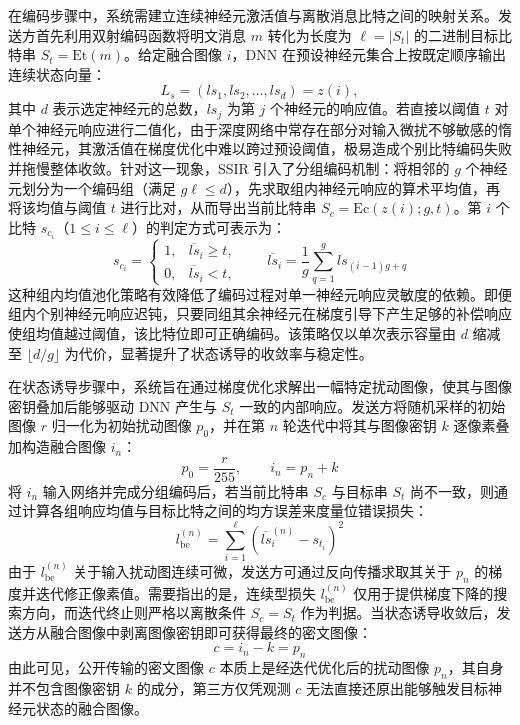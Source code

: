 在编码步骤中，系统需建立连续神经元激活值与离散消息比特之间的映射关系。发送方首先利用双射编码函数将明文消息 \(m\) 转化为长度为 \(\ell = \vert{}S_t\vert{}\) 的二进制目标比特串 \(S_t = \mathrm{Et}(m)\)。给定融合图像 \(i\)，DNN 在预设神经元集合上按既定顺序输出连续状态向量：
\begin{equation}
    L_s = (ls_1, ls_2, \ldots, ls_d) = z(i),
    \label{eq:state}
\end{equation}
其中 \(d\) 表示选定神经元的总数，\(ls_j\) 为第 \(j\) 个神经元的响应值。若直接以阈值 \(t\) 对单个神经元响应进行二值化，由于深度网络中常存在部分对输入微扰不够敏感的惰性神经元，其激活值在梯度优化中难以跨过预设阈值，极易造成个别比特编码失败并拖慢整体收敛。针对这一现象，SSIR 引入了分组编码机制：将相邻的 \(g\) 个神经元划分为一个编码组（满足 \(g \ell \le d\)），先求取组内神经元响应的算术平均值，再将该均值与阈值 \(t\) 进行比对，从而导出当前比特串 \(S_c = \mathrm{Ec}(z(i); g, t)\)。第 \(i\) 个比特 \(s_{c_i}\)（\(1 \le i \le \ell\)）的判定方式可表示为：
\begin{equation}
    s_{c_i} =
    \begin{cases}
        1, & \overline{ls}_i \ge t, \\
        0, & \overline{ls}_i < t,
    \end{cases}
    \qquad
    \overline{ls}_i = \frac{1}{g}\sum_{q=1}^{g} ls_{(i-1)g+q}
    \label{eq:encoding}
\end{equation}
这种组内均值池化策略有效降低了编码过程对单一神经元响应灵敏度的依赖。即便组内个别神经元响应迟钝，只要同组其余神经元在梯度引导下产生足够的补偿响应使组均值越过阈值，该比特位即可正确编码。该策略仅以单次表示容量由 \(d\) 缩减至 \(\lfloor d/g \rfloor\) 为代价，显著提升了状态诱导的收敛率与稳定性。

在状态诱导步骤中，系统旨在通过梯度优化求解出一幅特定扰动图像，使其与图像密钥叠加后能够驱动 DNN 产生与 \(S_t\) 一致的内部响应。发送方将随机采样的初始图像 \(r\) 归一化为初始扰动图像 \(p_0\)，并在第 \(n\) 轮迭代中将其与图像密钥 \(k\) 逐像素叠加构造融合图像 \(i_n\)：
\begin{equation}
    p_0 = \frac{r}{255}, \qquad i_n = p_n + k
    \label{eq:fusion}
\end{equation}
将 \(i_n\) 输入网络并完成分组编码后，若当前比特串 \(S_c\) 与目标串 \(S_t\) 尚不一致，则通过计算各组响应均值与目标比特之间的均方误差来度量位错误损失：
\begin{equation}
    l_{\mathrm{be}}^{(n)} = \sum_{i=1}^{\ell} \left( \overline{ls}_i^{(n)} - s_{t_i} \right)^2
    \label{eq:biterror}
\end{equation}
由于 \(l_{\mathrm{be}}^{(n)}\) 关于输入扰动图连续可微，发送方可通过反向传播求取其关于 \(p_n\) 的梯度并迭代修正像素值。需要指出的是，连续型损失 \(l_{\mathrm{be}}^{(n)}\) 仅用于提供梯度下降的搜索方向，而迭代终止则严格以离散条件 \(S_c = S_t\) 作为判据。当状态诱导收敛后，发送方从融合图像中剥离图像密钥即可获得最终的密文图像：
\begin{equation}
    c = i_n - k = p_n
    \label{eq:cipher}
\end{equation}
由此可见，公开传输的密文图像 \(c\) 本质上是经迭代优化后的扰动图像 \(p_n\)，其自身并不包含图像密钥 \(k\) 的成分，第三方仅凭观测 \(c\) 无法直接还原出能够触发目标神经元状态的融合图像。

